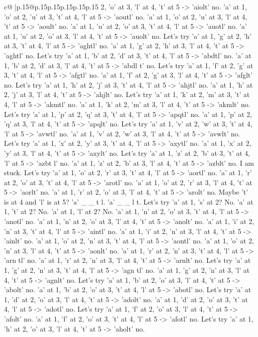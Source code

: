 \documentclass{article}
\begin{document}
{\begin{supertabular}{c@{$\;$}|p{.15\linewidth}@{}p{.15\linewidth}p{.15\linewidth}p{.15\linewidth}p{.15\linewidth}p{.15\linewidth}}
{{{2, 'o' at 3, 'l' at 4, 't' at 5 {-}> 'aiolt' no. 'a' at 1, 'o' at 2, 'u' at 3, 't' at 4, 'l' at 5 {-}> 'aoutl' no. 'a' at 1, 'o' at 2, 'u' at 3, 'l' at 4, 't' at 5 {-}> 'aoult' no. 'a' at 1, 'u' at 2, 'o' at 3, 't' at 4, 'l' at 5 {-}> 'auotl' no. 'a' at 1, 'u' at 2, 'o' at 3, 'l' at 4, 't' at 5 {-}> 'auolt' no. Let's try 'a' at 1, 'g' at 2, 'h' at 3, 't' at 4, 'l' at 5 {-}> 'aghtl' no. 'a' at 1, 'g' at 2, 'h' at 3, 'l' at 4, 't' at 5 {-}> 'aghtl' no. Let's try 'a' at 1, 'b' at 2, 'd' at 3, 't' at 4, 'l' at 5 {-}> 'abdtl' no. 'a' at 1, 'b' at 2, 'd' at 3, 'l' at 4, 't' at 5 {-}> 'abdl t' no. Let's try 'a' at 1, 'f' at 2, 'g' at 3, 't' at 4, 'l' at 5 {-}> 'afgtl' no. 'a' at 1, 'f' at 2, 'g' at 3, 'l' at 4, 't' at 5 {-}> 'afglt' no. Let's try 'a' at 1, 'h' at 2, 'j' at 3, 't' at 4, 'l' at 5 {-}> 'ahjtl' no. 'a' at 1, 'h' at 2, 'j' at 3, 'l' at 4, 't' at 5 {-}> 'ahjlt' no. Let's try 'a' at 1, 'k' at 2, 'm' at 3, 't' at 4, 'l' at 5 {-}> 'akmtl' no. 'a' at 1, 'k' at 2, 'm' at 3, 'l' at 4, 't' at 5 {-}> 'akmlt' no. Let's try 'a' at 1, 'p' at 2, 'q' at 3, 't' at 4, 'l' at 5 {-}> 'apqtl' no. 'a' at 1, 'p' at 2, 'q' at 3, 'l' at 4, 't' at 5 {-}> 'apqlt' no. Let's try 'a' at 1, 'v' at 2, 'w' at 3, 't' at 4, 'l' at 5 {-}> 'avwtl' no. 'a' at 1, 'v' at 2, 'w' at 3, 'l' at 4, 't' at 5 {-}> 'avwlt' no. Let's try 'a' at 1, 'x' at 2, 'y' at 3, 't' at 4, 'l' at 5 {-}> 'axytl' no. 'a' at 1, 'x' at 2, 'y' at 3, 'l' at 4, 't' at 5 {-}> 'axylt' no. Let's try 'a' at 1, 'z' at 2, 'b' at 3, 't' at 4, 'l' at 5 {-}> 'azbt l' no. 'a' at 1, 'z' at 2, 'b' at 3, 'l' at 4, 't' at 5 {-}> 'azblt' no. I am stuck. Let's try 'a' at 1, 'o' at 2, 'r' at 3, 't' at 4, 'l' at 5 {-}> 'aortl' no. 'a' at 1, 'r' at 2, 'o' at 3, 't' at 4, 'l' at 5 {-}> 'arotl' no. 'a' at 1, 'o' at 2, 'r' at 3, 'l' at 4, 't' at 5 {-}> 'aorlt' no. 'a' at 1, 'r' at 2, 'o' at 3, 'l' at 4, 't' at 5 {-}> 'arolt' no. Maybe 't' is at 4 and 'l' is at 5? 'a' \_ \_ t l. 'a' \_ \_ l t. Let's try 'a' at 1, 's' at 2? No. 'a' at 1, 't' at 2? No. 'a' at 1, 'l' at 2? No. 'a' at 1, 'n' at 2, 'o' at 3, 't' at 4, 'l' at 5 {-}> 'anotl' no. 'a' at 1, 'n' at 2, 'o' at 3, 'l' at 4, 't' at 5 {-}> 'anolt' no. 'a' at 1, 'i' at 2, 'n' at 3, 't' at 4, 'l' at 5 {-}> 'aintl' no. 'a' at 1, 'i' at 2, 'n' at 3, 'l' at 4, 't' at 5 {-}> 'ainlt' no. 'a' at 1, 'o' at 2, 'n' at 3, 't' at 4, 'l' at 5 {-}> 'aontl' no. 'a' at 1, 'o' at 2, 'n' at 3, 'l' at 4, 't' at 5 {-}> 'aonlt' no. 'a' at 1, 'r' at 2, 'n' at 3, 't' at 4, 'l' at 5 {-}> 'arn tl' no. 'a' at 1, 'r' at 2, 'n' at 3, 'l' at 4, 't' at 5 {-}> 'arnlt' no. Let's try 'a' at 1, 'g' at 2, 'n' at 3, 't' at 4, 'l' at 5 {-}> 'agn tl' no. 'a' at 1, 'g' at 2, 'n' at 3, 'l' at 4, 't' at 5 {-}> 'agnlt' no. Let's try 'a' at 1, 'b' at 2, 'o' at 3, 'l' at 4, 't' at 5 {-}> 'abolt' no. 'a' at 1, 'b' at 2, 'o' at 3, 't' at 4, 'l' at 5 {-}> 'abotl' no. Let's try 'a' at 1, 'd' at 2, 'o' at 3, 'l' at 4, 't' at 5 {-}> 'adolt' no. 'a' at 1, 'd' at 2, 'o' at 3, 't' at 4, 'l' at 5 {-}> 'adotl' no. Let's try 'a' at 1, 'f' at 2, 'o' at 3, 'l' at 4, 't' at 5 {-}> 'afolt' no. 'a' at 1, 'f' at 2, 'o' at 3, 't' at 4, 'l' at 5 {-}> 'afotl' no. Let's try 'a' at 1, 'h' at 2, 'o' at 3, 'l' at 4, 't' at 5 {-}> 'aholt' no. }}}
\end{supertabular}}
\end{document}
